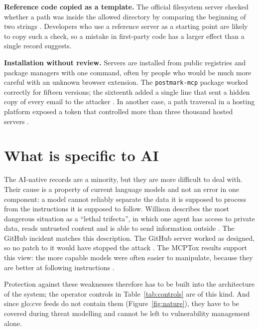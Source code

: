 \par \textbf{Reference code copied as a template.} The official filesystem server checked whether a path was inside the allowed directory by comparing the beginning of two strings \cite{cymulate2025}. Developers who use a reference server as a starting point are likely to copy such a check, so a mistake in first-party code has a larger effect than a single record suggests.

\par \textbf{Installation without review.} Servers are installed from public registries and package managers with one command, often by people who would be much more careful with an unknown browser extension. The \texttt{postmark-mcp} package worked correctly for fifteen versions; the sixteenth added a single line that sent a hidden copy of every email to the attacker \cite{thn2025postmark}. In another case, a path traversal in a hosting platform exposed a token that controlled more than three thousand hosted servers \cite{gitguardian2025}.

\section{What is specific to AI}

\par The AI-native records are a minority, but they are more difficult to deal with. Their cause is a property of current language models and not an error in one component: a model cannot reliably separate the data it is supposed to process from the instructions it is supposed to follow. Willison describes the most dangerous situation as a ``lethal trifecta'', in which one agent has access to private data, reads untrusted content and is able to send information outside \cite{willison2025}. The GitHub incident matches this description. The GitHub server worked as designed, so no patch to it would have stopped the attack \cite{invariant2025github}. The MCPTox results support this view: the more capable models were often easier to manipulate, because they are better at following instructions \cite{wang2025mcptox}.

\par Protection against these weaknesses therefore has to be built into the architecture of the system; the operator controls in Table~\ref{tab:controls} are of this kind. And since \acrshort{glo:cve} feeds do not contain them (Figure~\ref{fig:nature}), they have to be covered during threat modelling and cannot be left to vulnerability management alone.

